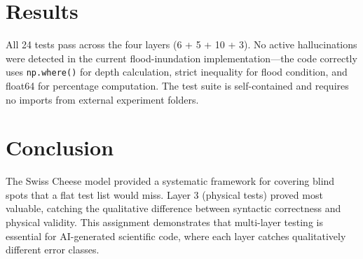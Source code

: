 \documentclass[12pt,a4paper]{article}
\begin{document}
\section{Results}
All 24 tests pass across the four layers (6 + 5 + 10 + 3). No active hallucinations were detected in the current flood-inundation implementation—the code correctly uses \texttt{np.where()} for depth calculation, strict inequality for flood condition, and float64 for percentage computation. The test suite is self-contained and requires no imports from external experiment folders.

\section{Conclusion}
The Swiss Cheese model provided a systematic framework for covering blind spots that a flat test list would miss. Layer 3 (physical tests) proved most valuable, catching the qualitative difference between syntactic correctness and physical validity. This assignment demonstrates that multi-layer testing is essential for AI-generated scientific code, where each layer catches qualitatively different error classes.
\end{document}
